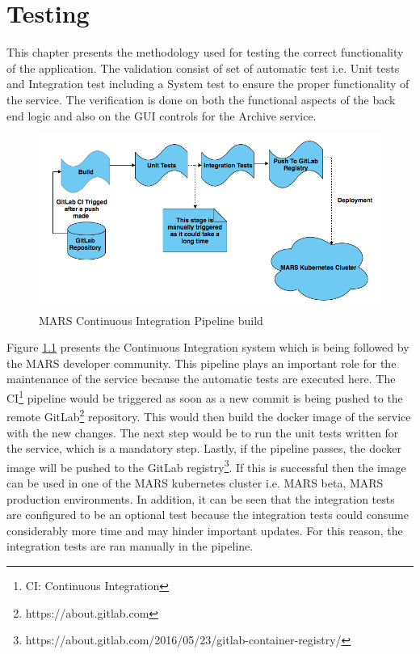 \chapter{Testing}
This chapter presents the methodology used for testing the correct functionality of the application. The validation consist of set of automatic test i.e.
Unit tests and Integration test including a System test to ensure the proper functionality of the service. The verification is done on both the functional
aspects of the back end logic and also on the GUI controls for the Archive service.

\begin{figure}[H]
    \centering \includegraphics[scale=0.5]{grafiken/CIbuild.png}
    \caption{MARS Continuous Integration Pipeline build}
    \label{fig:CIbuild}
\end{figure}

Figure \ref{fig:CIbuild} presents the Continuous Integration system which is being followed by the MARS developer community. This pipeline plays an important role
for the maintenance of the service because the automatic tests are executed here.
The CI\footnote{CI: Continuous Integration} pipeline would be triggered as soon as a new commit is being pushed to the remote 
GitLab\footnote{https://about.gitlab.com} repository. This would then build the docker image of the service with the new changes. The next step would be to
run the unit tests written for the service, which is a mandatory step. Lastly, if the pipeline passes, the docker image will be pushed
to the GitLab registry\footnote{https://about.gitlab.com/2016/05/23/gitlab-container-registry/}. If this is successful then the image can be used in one of 
the MARS kubernetes cluster i.e. MARS beta, MARS production environments. In addition,
it can be seen that the integration tests are configured to be an optional test because the integration tests could consume considerably more time and may hinder
important updates. For this reason, the integration tests are ran manually in the pipeline.




